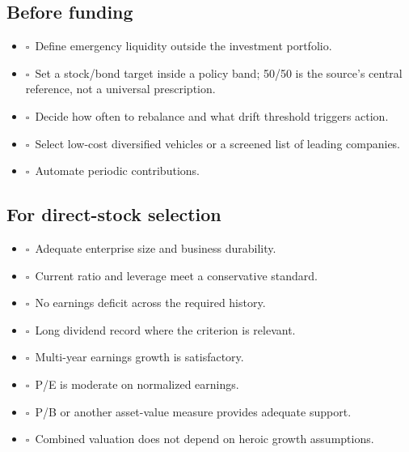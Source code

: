 \documentclass[11pt]{article}
\newcommand{\checkbox}{\(\square\)}
\begin{document}
\subsection{Before funding}
\begin{itemize}
\item \checkbox\ Define emergency liquidity outside the investment portfolio.
\item \checkbox\ Set a stock/bond target inside a policy band; 50/50 is the source's central reference, not a universal prescription.
\item \checkbox\ Decide how often to rebalance and what drift threshold triggers action.
\item \checkbox\ Select low-cost diversified vehicles or a screened list of leading companies.
\item \checkbox\ Automate periodic contributions.
\end{itemize}

\subsection{For direct-stock selection}
\begin{itemize}
\item \checkbox\ Adequate enterprise size and business durability.
\item \checkbox\ Current ratio and leverage meet a conservative standard.
\item \checkbox\ No earnings deficit across the required history.
\item \checkbox\ Long dividend record where the criterion is relevant.
\item \checkbox\ Multi-year earnings growth is satisfactory.
\item \checkbox\ P/E is moderate on normalized earnings.
\item \checkbox\ P/B or another asset-value measure provides adequate support.
\item \checkbox\ Combined valuation does not depend on heroic growth assumptions.
\end{itemize}
\end{document}
